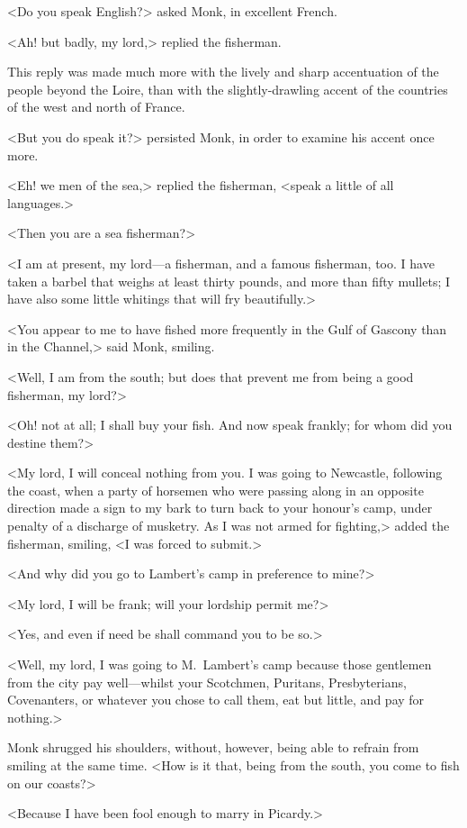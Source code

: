 <Do you speak English?> asked Monk, in excellent French.

<Ah! but badly, my lord,> replied the fisherman.

This reply was made much more with the lively and sharp accentuation of the people beyond the Loire, than with the slightly-drawling accent of the countries of the west and north of France.

<But you do speak it?> persisted Monk, in order to examine his accent once more.

<Eh! we men of the sea,> replied the fisherman, <speak a little of all languages.>

<Then you are a sea fisherman?>

<I am at present, my lord—a fisherman, and a famous fisherman, too. I have taken a barbel that weighs at least thirty pounds, and more than fifty mullets; I have also some little whitings that will fry beautifully.>

<You appear to me to have fished more frequently in the Gulf of Gascony than in the Channel,> said Monk, smiling.

<Well, I am from the south; but does that prevent me from being a good fisherman, my lord?>

<Oh! not at all; I shall buy your fish. And now speak frankly; for whom did you destine them?>

<My lord, I will conceal nothing from you. I was going to Newcastle, following the coast, when a party of horsemen who were passing along in an opposite direction made a sign to my bark to turn back to your honour's camp, under penalty of a discharge of musketry. As I was not armed for fighting,> added the fisherman, smiling, <I was forced to submit.>

<And why did you go to Lambert's camp in preference to mine?>

<My lord, I will be frank; will your lordship permit me?>

<Yes, and even if need be shall command you to be so.>

<Well, my lord, I was going to M.~Lambert's camp because those gentlemen from the city pay well—whilst your Scotchmen, Puritans, Presbyterians, Covenanters, or whatever you chose to call them, eat but little, and pay for nothing.>

Monk shrugged his shoulders, without, however, being able to refrain from smiling at the same time. <How is it that, being from the south, you come to fish on our coasts?>

<Because I have been fool enough to marry in Picardy.>

